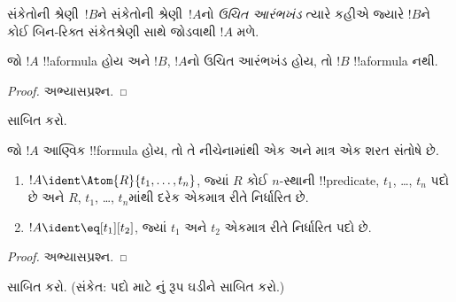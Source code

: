 \documentclass[../../../include/open-logic-section]{subfiles}
\begin{document}
\begin{defn}[ઉચિત આરંભખંડ]
સંકેતોની શ્રેણી~$!B$ને સંકેતોની શ્રેણી~$!A$નો \emph{ઉચિત આરંભખંડ}
ત્યારે કહીએ જ્યારે $!B$ને કોઈ બિન-રિક્ત સંકેતશ્રેણી સાથે જોડવાથી
$!A$ મળે.
\end{defn}

\begin{lem}
જો $!A$ !!a{formula} હોય અને $!B$, $!A$નો ઉચિત આરંભખંડ હોય, તો
$!B$ !!a{formula} નથી.
\end{lem}

\begin{proof}
અભ્યાસપ્રશ્ન.
\end{proof}

\begin{prob}
 સાબિત કરો.
\end{prob}

\begin{prop}
જો $!A$ આણ્વિક !!{formula} હોય, તો તે નીચેનામાંથી એક અને માત્ર એક
શરત સંતોષે છે.
\begin{enumerate}
\item $!A \ident \Atom{R}{t_1,\dots,t_n}$, જ્યાં $R$ કોઈ $n$-સ્થાની
  !!{predicate}, $t_1$, \dots, $t_n$ પદો છે અને $R$, $t_1$, \dots,
  $t_n$માંથી દરેક એકમાત્ર રીતે નિર્ધારિત છે.
\item $!A \ident \eq[t_1][t_2]$, જ્યાં $t_1$ અને $t_2$ એકમાત્ર રીતે
  નિર્ધારિત પદો છે.
\end{enumerate}
\end{prop}

\begin{proof}
અભ્યાસપ્રશ્ન.
\end{proof}

\begin{prob}
 સાબિત કરો. (સંકેત: પદો માટે
નું રૂપ ઘડીને સાબિત કરો.)
\end{prob}
\end{document}
